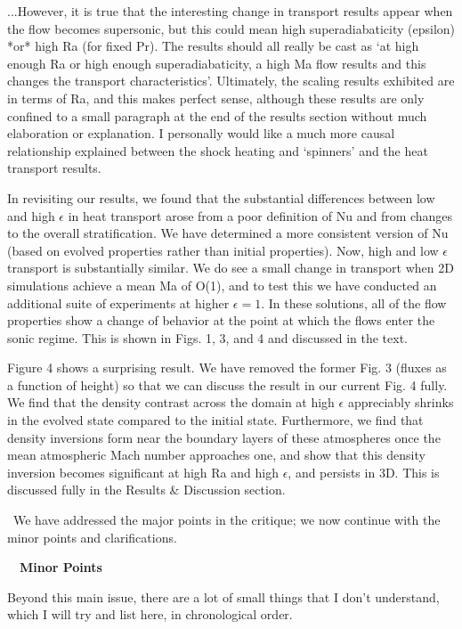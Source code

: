 \documentclass[aps, 11pt, singlecolumn]{revtex4-1} %
\begin{document}
\begin{singlespace}
\begin{myquotation}
...However, it is true that the
interesting change in transport results appear when the flow becomes
supersonic, but this could mean high superadiabaticity (epsilon) *or*
high Ra (for fixed Pr). The results should all really be cast as
`at high enough Ra or high enough superadiabaticity, a high Ma flow
results and this changes the transport characteristics'.
Ultimately, the scaling results exhibited are in terms of Ra, and this
makes perfect sense, although these results are only confined to a
small paragraph at the end of the results section without much
elaboration or explanation. I personally would like a much more causal
relationship explained between the shock heating and `spinners'
and the heat transport results.
\end{myquotation}
In revisiting our results, we found that the substantial differences between
low and high $\epsilon$ in heat transport arose from a poor definition of
Nu and from changes to the overall stratification.  We have determined a
more consistent version of Nu (based on evolved properties rather than initial
properties).  Now, high and low $\epsilon$ transport is substantially similar.
We do see a small change in transport when 2D simulations achieve a mean
Ma of O(1), and to test this we have conducted an additional suite of
experiments at higher $\epsilon = 1$.  In these solutions, all of the flow
properties show a change of behavior at the point at which the flows enter the
sonic regime.  This is shown in Figs. 1, 3, and 4 and discussed in the text.

Figure 4 shows a surprising result.  We have removed the former Fig. 3 (fluxes
as a function of height) so that we can discuss the result in our current
Fig. 4 fully.  We find that the density contrast across the domain at high $\epsilon$
appreciably shrinks in the evolved state compared to the initial state.  Furthermore, we find
that density inversions form near the boundary layers of these atmospheres once the mean atmospheric Mach number approaches
one, and show that this density inversion becomes significant at high Ra and high $\epsilon$,
and persists in 3D.  This is discussed fully in the Results \& Discussion section.

$\,$\newline\noindent
We have addressed the major points in the critique; we now continue with the
minor points and clarifications.

$\,$
\newline
$\,$
\newline
\indent
\large{\textbf{Minor Points}}\newline
\begin{myquotation}
Beyond this main issue, there are a lot of small things that I don't
understand, which I will try and list here, in chronological order.


\end{myquotation}
\end{singlespace}
\end{document}
